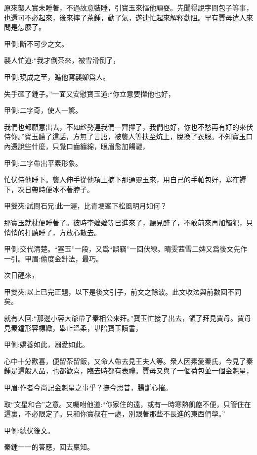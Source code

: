 \begin{parag}
    原來襲人實未睡著，不過故意裝睡，引寶玉來慪他頑耍。先聞得說字問包子等事，也還可不必起來，後來摔了茶鍾，動了氣，遂連忙起來解釋勸阻。早有賈母遣人來問是怎麼了。\begin{note}甲側:斷不可少之文。\end{note}襲人忙道:“我才倒茶來，被雪滑倒了，\begin{note}甲側:現成之至，瞧他寫襲卿爲人。\end{note}失手砸了鍾子。”一面又安慰寶玉道:“你立意要攆他也好，\begin{note}甲側:二字奇，使人一驚。\end{note}我們也都願意出去，不如趁勢連我們一齊攆了，我們也好，你也不愁再有好的來伏侍你。”寶玉聽了這話，方無了言語，被襲人等扶至炕上，脫換了衣服。不知寶玉口內還說些什麼，只覺口齒纏綿，眼眉愈加餳澀，\begin{note}甲側:二字帶出平素形象。\end{note}忙伏侍他睡下。襲人伸手從他項上摘下那通靈玉來，用自己的手帕包好，塞在褥下，次日帶時便冰不著脖子。\begin{note}甲雙夾:試問石兄:此一渥，比青埂峯下松風明月如何？\end{note}那寶玉就枕便睡著了。彼時李嬤嬤等已進來了，聽見醉了，不敢前來再加觸犯，只悄悄的打聽睡了，方放心散去。\begin{note}甲側:交代清楚。“塞玉”一段，又爲“誤竊”一回伏線。晴雯茜雪二婢又爲後文先作一引。甲眉:偷度金針法，最巧。\end{note}
\end{parag}


\begin{parag}
    次日醒來，\begin{note}甲雙夾:以上已完正題，以下是後文引子，前文之餘波。此文收法與前數回不同矣。\end{note}就有人回:“那邊小蓉大爺帶了秦相公來拜。”寶玉忙接了出去，領了拜見賈母。賈母見秦鐘形容標緻，舉止溫柔，堪陪寶玉讀書，\begin{note}甲側:嬌養如此，溺愛如此。\end{note}心中十分歡喜，便留茶留飯，又命人帶去見王夫人等。衆人因素愛秦氏，今見了秦鍾是這般人品，也都歡喜，臨去時都有表禮。賈母又與了一個荷包並一個金魁星，\begin{note}甲眉:作者今尚記金魁星之事乎？撫今思昔，腸斷心摧。\end{note}取“文星和合”之意。又囑咐他道:“你家住的遠，或有一時寒熱飢飽不便，只管住在這裏，不必限定了。只和你寶叔在一處，別跟著那些不長進的東西們學。”\begin{note}甲側:總伏後文。\end{note}秦鍾一一的答應，回去稟知。
\end{parag}


